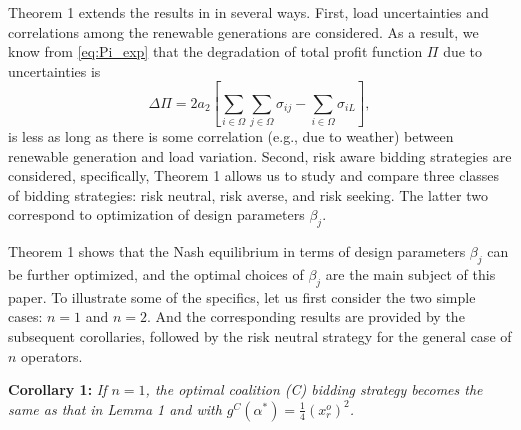 \documentclass[journal]{IEEEtran}
\begin{document}
Theorem 1 extends the results in \cite{Chow2017} in several ways. First, load uncertainties and correlations among the renewable generations are considered.  As a result, we know from \eqref{eq:Pi_exp} that the degradation of total profit function $\Pi$ due to uncertainties is 
\begin{equation} 
\Delta \Pi = 2a_2 \left[ \sum_{i\in\Omega}\sum_{j\in\Omega}\sigma_{ij}- \sum_{i\in\Omega} \sigma_{iL}\right], \label{eq:D_P}
\end{equation}
is less as long as there is some correlation (e.g., due to weather) between renewable generation and load variation. Second, risk aware bidding strategies are considered, specifically, Theorem 1 allows us to study and compare three classes of bidding strategies: risk neutral, risk averse, and risk seeking. The latter two correspond to optimization of design parameters $\beta_j$. 

Theorem 1 shows that the Nash equilibrium in terms of design parameters $\beta_j$ can be further optimized, and the optimal choices of $\beta_j$ are the main subject of this paper. To illustrate some of the specifics, let us first consider the two simple cases: $n=1$ and $n=2$. And the corresponding results are provided by the subsequent corollaries, followed by the risk neutral strategy for the general case of $n$ operators. 

\noindent  \textbf{Corollary 1:} {\it If $n=1$, the optimal coalition (C) bidding strategy becomes the same as that in Lemma 1 and with $g^C(\alpha^*)=\frac{1}{4} (x_r^o)^2$.}
\end{document}
